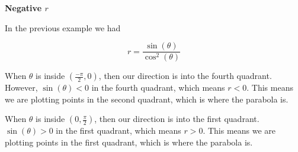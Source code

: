 \documentclass{ximera}
\begin{document}
\begin{warning} \textbf{\textcolor{red!70!black}{Negative $r$}}

      In the previous example we had 

\[ r=\frac{\sin(\theta)}{\cos^2(\theta)} \]

      When $\theta$ is inside $\left( \frac{-\pi}{2}, 0 \right)$, then our direction is into the fourth quadrant.  However, $\sin(\theta) < 0$ in the fourth quadrant, which means $r < 0$.  This means we are plotting points in the second quadrant, which is where the parabola is.


      When $\theta$ is inside $\left( 0, \frac{\pi}{2} \right)$, then our direction is into the first quadrant.   $\sin(\theta) > 0$ in the first quadrant, which means $r > 0$.  This means we are plotting points in the first quadrant, which is where the parabola is.

\end{warning}
\end{document}
